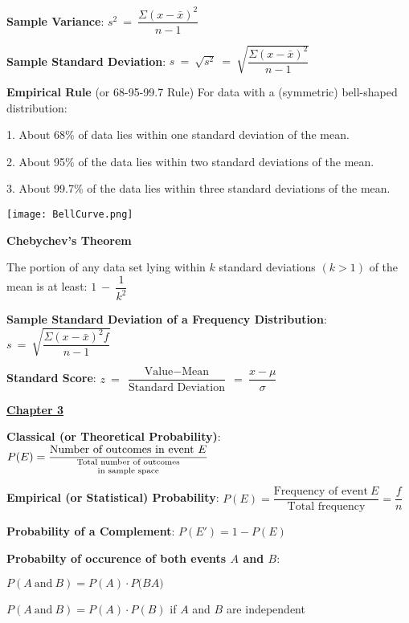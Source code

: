 \documentclass{article}
\begin{document}
\begin{large}
\textbf{Sample Variance}:  $s^{2}\ =\ \dfrac{\Sigma (x - \bar{x})^{2}}{n-1}$

\textbf{Sample Standard Deviation}: $s\ =\ \sqrt{s^{2}}\ =\ \sqrt{\dfrac{\Sigma (x - \bar{x})^{2}}{n-1}}$

\textbf{Empirical Rule} (or 68-95-99.7 Rule) For data with a (symmetric) bell-shaped distribution:

1. About 68\% of data lies within one standard deviation of the mean.

2. About 95\% of the data lies within two standard deviations of the mean.

3. About 99.7\% of the data lies within three standard deviations of the mean.

\texttt{[image: BellCurve.png]}

\textbf{Chebychev's Theorem}

\hspace{0.1in} The portion of any data set lying within $k$ standard deviations $(k > 1)$ of the mean is at least: $1\ -\ \dfrac{1}{k^{2}}$

\textbf{Sample Standard Deviation of a Frequency Distribution}: $s\ =\ \sqrt{\dfrac{\Sigma (x - \bar{x})^{2}f}{n-1}}$

\textbf{Standard Score}: $z\ =\ \dfrac{\text{Value} - \text{Mean}}{\text{Standard Deviation}}\ =\ \dfrac{x - \mu}{\sigma}$

\vspace{0.25in}

\underline{\textbf{\huge Chapter 3 \phantom{ } \phantom{ } \phantom{ } \phantom{ }}}

\textbf{Classical (or Theoretical Probability)}: $P(E) = \dfrac{\text{Number of outcomes in event}\ E}{\genfrac{}{}{0pt}{}{\text{Total number of outcomes}}{\text{in sample space}}}$

\textbf{Empirical (or Statistical) Probability}: $P(E) = \dfrac{\text{Frequency of event}\ E}{\text{Total frequency}} = \dfrac{f}{n}$

\textbf{Probability of a Complement}: $P(E') = 1 - P(E)$

\vspace{0.5in}
\textbf{Probabilty of occurence of both events $A$ and $B$}:

\hspace{0.1in} $P(A\ \text{and}\ B) = P(A)\cdot P(B $\textbar $ A)$

\hspace{0.1in} $P(A\ \text{and}\ B) = P(A)\cdot P(B)$ if $A$ and $B$ are independent


\end{large}
\end{document}
